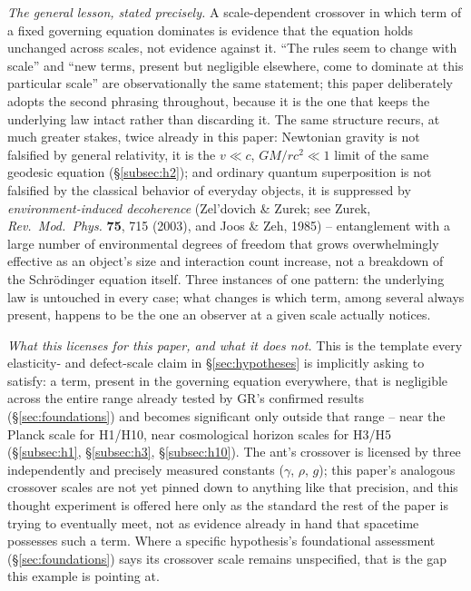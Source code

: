 \documentclass[12pt, a4paper]{article}
\begin{document}
\emph{The general lesson, stated precisely.} A scale-dependent
crossover in which term of a fixed governing equation dominates is
evidence that the equation holds unchanged across scales, not
evidence against it. ``The rules seem to change with scale'' and
``new terms, present but negligible elsewhere, come to dominate at
this particular scale'' are observationally the same statement; this
paper deliberately adopts the second phrasing throughout, because it
is the one that keeps the underlying law intact rather than
discarding it. The same structure recurs, at much greater stakes,
twice already in this paper: Newtonian gravity is not falsified by
general relativity, it is the $v\ll c$, $GM/rc^2\ll1$ limit of the
same geodesic equation (\S\ref{subsec:h2}); and ordinary quantum
superposition is not falsified by the classical behavior of everyday
objects, it is suppressed by \emph{environment-induced decoherence}
(Zel'dovich \& Zurek; see Zurek, \emph{Rev.\ Mod.\ Phys.} \textbf{75},
715 (2003), and Joos \& Zeh, 1985) -- entanglement with a large
number of environmental degrees of freedom that grows overwhelmingly
effective as an object's size and interaction count increase, not a
breakdown of the Schr\"odinger equation itself. Three instances of one
pattern: the underlying law is untouched in every case; what changes
is which term, among several always present, happens to be the one
an observer at a given scale actually notices.

\emph{What this licenses for this paper, and what it does not.} This
is the template every elasticity- and defect-scale claim in
\S\ref{sec:hypotheses} is implicitly asking to satisfy: a term,
present in the governing equation everywhere, that is negligible
across the entire range already tested by GR's confirmed results
(\S\ref{sec:foundations}) and becomes significant only outside that
range -- near the Planck scale for H1/H10, near cosmological horizon
scales for H3/H5 (\S\ref{subsec:h1}, \S\ref{subsec:h3},
\S\ref{subsec:h10}). The ant's crossover is licensed by three
independently and precisely measured constants ($\gamma$, $\rho$,
$g$); this paper's analogous crossover scales are not yet pinned down
to anything like that precision, and this thought experiment is
offered here only as the standard the rest of the paper is trying to
eventually meet, not as evidence already in hand that spacetime
possesses such a term. Where a specific hypothesis's foundational
assessment (\S\ref{sec:foundations}) says its crossover scale remains
unspecified, that is the gap this example is pointing at.
\end{document}
